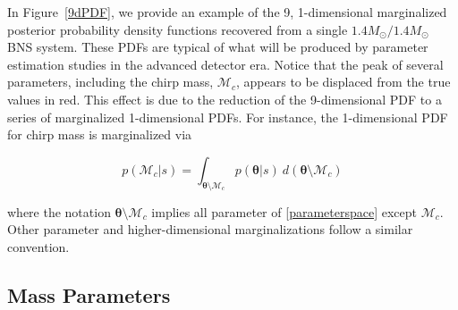 \documentclass[11pt,a4paper]{emulateapj}
\newcommand{\thpara}{\boldsymbol{\theta}}
\newcommand{\chmass}{\mathcal{M}_c}
\begin{document}
In Figure~\ref{9dPDF}, we provide an example of the 9, 1-dimensional marginalized posterior 
probability density functions recovered from a single $1.4M_{\odot}/1.4M_{\odot}$ BNS system. 
 These PDFs are typical of what will be produced by parameter estimation studies in the advanced 
 detector era.  Notice that the peak of several parameters, including the chirp mass, $\chmass$, 
 appears to be displaced from the true values in red.  This effect is due to the reduction of the
  9-dimensional PDF to a series of marginalized 1-dimensional PDFs.  For instance, the 1-dimensional 
  PDF for chirp mass is marginalized via

\begin{equation}
p(\chmass | s) = \int _{\thpara \setminus \chmass} p(\thpara | s)~d(\thpara \setminus \chmass)
\label{mcMarginalization}
\end{equation}

\noindent where the notation $\thpara \setminus \chmass$ implies all
parameter of \eqref{parameterspace} except $\chmass$.  Other parameter and higher-dimensional marginalizations follow a similar convention.



\subsection{Mass Parameters}
\label{massSection}
\end{document}
